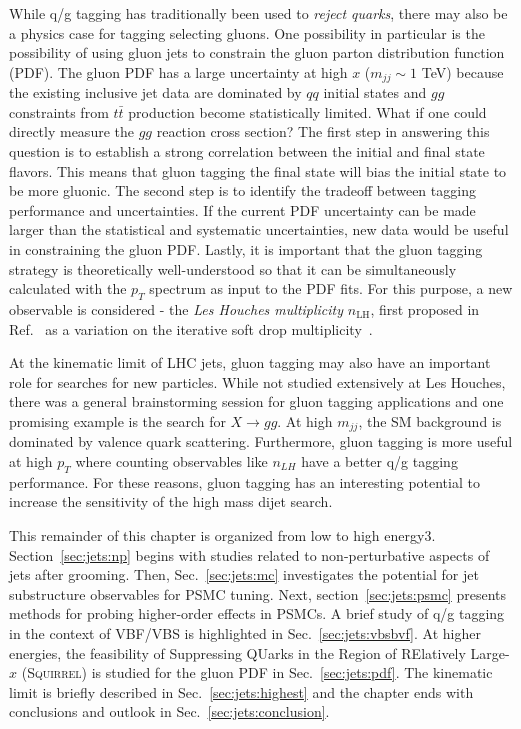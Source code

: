 \documentclass[11pt]{cernrep}
\begin{document}
While q/g tagging has traditionally been used to \textit{reject quarks}, there may also be a physics case for tagging selecting gluons.  One possibility in particular is the possibility of using gluon jets to constrain the gluon parton distribution function (PDF).  The gluon PDF has a large uncertainty at high $x$ ($m_{jj}\sim 1$ TeV) because the existing inclusive jet data are dominated by $qq$ initial states and $gg$ constraints from $t\bar{t}$ production become statistically limited.  What if one could directly measure the $gg$ reaction cross section?  The first step in answering this question is to establish a strong correlation between the initial and final state flavors.  This means that gluon tagging the final state will bias the initial state to be more gluonic.   The second step is to identify the tradeoff between tagging performance and uncertainties.  If the current PDF uncertainty can be made larger than the statistical and systematic uncertainties, new data would be useful in constraining the gluon PDF.  Lastly, it is important that the gluon tagging strategy is theoretically well-understood so that it can be simultaneously calculated with the $p_T$ spectrum as input to the PDF fits.  For this purpose, a new observable is considered - the \textit{Les Houches multiplicity} $n_\text{LH}$, first proposed in Ref.~\cite{Marzani:2019hun} as a variation on the iterative soft drop multiplicity~\cite{Frye:2017yrw}.

At the kinematic limit of LHC jets, gluon tagging may also have an important role for searches for new particles.  While not studied extensively at Les Houches, there was a general brainstorming session for gluon tagging applications and one promising example is the search for $X\rightarrow gg$.  At high $m_{jj}$, the SM background is dominated by valence quark scattering.  Furthermore, gluon tagging is more useful at high $p_T$ where counting observables like $n_{LH}$ have a better q/g tagging performance.  For these reasons, gluon tagging has an interesting potential to increase the sensitivity of the high mass dijet search.

This remainder of this chapter is organized from low to high energy3.  Section~\ref{sec:jets:np} begins with studies related to non-perturbative aspects of jets after grooming.  Then, Sec.~\ref{sec:jets:mc} investigates the potential for jet substructure observables for PSMC tuning.  Next, section~\ref{sec:jets:psmc} presents methods for probing higher-order effects in PSMCs.  A brief study of q/g tagging in the context of VBF/VBS is highlighted in Sec.~\ref{sec:jets:vbsbvf}.  At higher energies, the feasibility of Suppressing QUarks in the Region of RElatively Large-$x$ (\textsc{Squirrel}) is studied for the gluon PDF in Sec.~\ref{sec:jets:pdf}.  The kinematic limit is briefly described in Sec.~\ref{sec:jets:highest} and the chapter ends with conclusions and outlook in Sec.~\ref{sec:jets:conclusion}.
\end{document}
